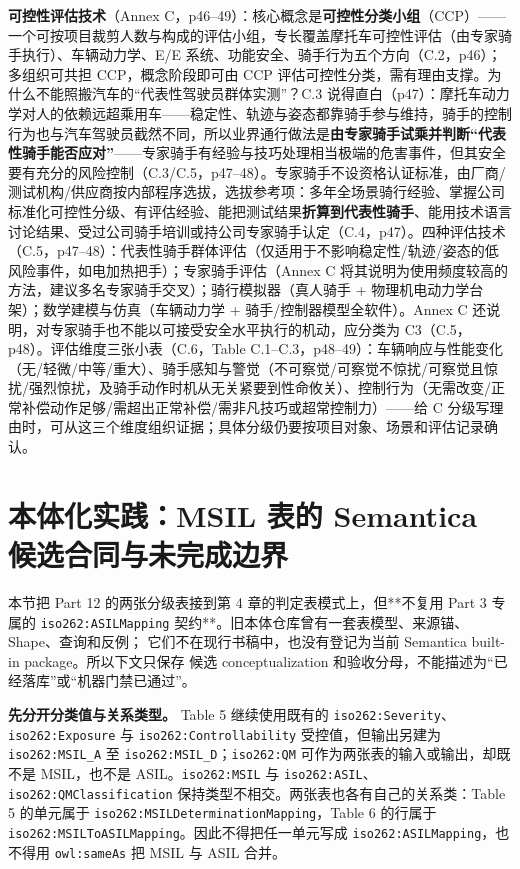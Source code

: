 \textbf{可控性评估技术}（Annex C，p46–49）：核心概念是\textbf{可控性分类小组}（CCP）——一个可按项目裁剪人数与构成的评估小组，专长覆盖摩托车可控性评估（由专家骑手执行）、车辆动力学、E/E 系统、功能安全、骑手行为五个方向（C.2，p46）；多组织可共担 CCP，概念阶段即可由 CCP 评估可控性分类，需有理由支撑。为什么不能照搬汽车的“代表性驾驶员群体实测”？C.3 说得直白（p47）：摩托车动力学对人的依赖远超乘用车——稳定性、轨迹与姿态都靠骑手参与维持，骑手的控制行为也与汽车驾驶员截然不同，所以业界通行做法是\textbf{由专家骑手试乘并判断“代表性骑手能否应对”}——专家骑手有经验与技巧处理相当极端的危害事件，但其安全要有充分的风险控制（C.3/C.5，p47–48）。专家骑手不设资格认证标准，由厂商/测试机构/供应商按内部程序选拔，选拔参考项：多年全场景骑行经验、掌握公司标准化可控性分级、有评估经验、能把测试结果\textbf{折算到代表性骑手}、能用技术语言讨论结果、受过公司骑手培训或持公司专家骑手认定（C.4，p47）。四种评估技术（C.5，p47–48）：代表性骑手群体评估（仅适用于不影响稳定性/轨迹/姿态的低风险事件，如电加热把手）；专家骑手评估（Annex C 将其说明为使用频度较高的方法，建议多名专家骑手交叉）；骑行模拟器（真人骑手 + 物理机电动力学台架）；数学建模与仿真（车辆动力学 + 骑手/控制器模型全软件）。Annex C 还说明，对专家骑手也不能以可接受安全水平执行的机动，应分类为 C3（C.5，p48）。评估维度三张小表（C.6，Table C.1–C.3，p48–49）：车辆响应与性能变化（无/轻微/中等/重大）、骑手感知与警觉（不可察觉/可察觉不惊扰/可察觉且惊扰/强烈惊扰，及骑手动作时机从无关紧要到性命攸关）、控制行为（无需改变/正常补偿动作足够/需超出正常补偿/需非凡技巧或超常控制力）——给 C 分级写理由时，可从这三个维度组织证据；具体分级仍要按项目对象、场景和评估记录确认。

\section{本体化实践：MSIL 表的 Semantica 候选合同与未完成边界}

本节把 Part 12 的两张分级表接到第 4 章的判定表模式上，但**不复用 Part 3 专属的
\nolinkurl{iso262:ASILMapping} 契约**。旧本体仓库曾有一套表模型、来源锚、Shape、查询和反例；
它们不在现行书稿中，也没有登记为当前 Semantica built-in package。所以下文只保存
候选 conceptualization 和验收分母，不能描述为“已经落库”或“机器门禁已通过”。

\textbf{先分开分类值与关系类型。} Table 5 继续使用既有的 \nolinkurl{iso262:Severity}、\nolinkurl{iso262:Exposure} 与 \nolinkurl{iso262:Controllability} 受控值，但输出另建为 \nolinkurl{iso262:MSIL_A} 至 \nolinkurl{iso262:MSIL_D}；\nolinkurl{iso262:QM} 可作为两张表的输入或输出，却既不是 MSIL，也不是 ASIL。\nolinkurl{iso262:MSIL} 与 \nolinkurl{iso262:ASIL}、\nolinkurl{iso262:QMClassification} 保持类型不相交。两张表也各有自己的关系类：Table 5 的单元属于 \nolinkurl{iso262:MSILDeterminationMapping}，Table 6 的行属于 \nolinkurl{iso262:MSILToASILMapping}。因此不得把任一单元写成 \nolinkurl{iso262:ASILMapping}，也不得用 \nolinkurl{owl:sameAs} 把 MSIL 与 ASIL 合并。

